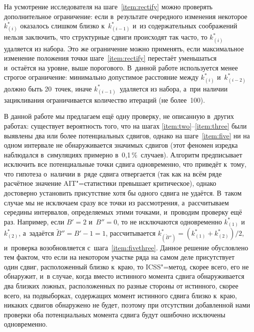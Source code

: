 \documentclass[11pt]{article}
\begin{document}
На усмотрение исследователя на шаге~\ref{item:rectify} можно проверять дополнительное ограничение: если в~результате очередного изменения некоторое $k^*_{(i)}$ оказалось слишком близко к~$k^*_{(i-1)}$ и~из содержательных соображений нельзя заключить, что структурные сдвиги происходят так часто, то $k^*_{(i)}$ удаляется из набора. Это же ограничение можно применять, если максимальное изменение положения точки шаге~\ref{item:rectify} перестаёт уменьшаться и~остаётся на уровне, выше порогового. В~данной работе используется менее строгое ограничение: минимально допустимое расстояние между $k^*_{(i)}$ и~$k^*_{(i-2)}$ должно быть 20~точек, иначе $k^*_{(i-1)}$~удаляется из набора, а~при наличии зацикливания ограничивается количество итераций (не более~100).

В данной работе мы предлагаем ещё одну проверку, не описанную в~других работах: существует вероятность того, что на шагах \ref{item:two}--\ref{item:three} были выявлены два или более потенциальных сдвигов, однако на шаге~\ref{item:five} ни на одном интервале не обнаруживается значимых сдвигов (этот феномен изредка наблюдался в~симуляциях примерно в~0{,}1\,\%~случаев). Алгоритм предписывает исключить все потенциальные точки сдвига одновременно, что приведёт к~тому, что гипотеза о~наличии в~ряде сдвига отвергается (так как на всём ряде расчётное значение AIT"=статистики превышает критическое), однако достоверно установить присутствие хотя бы одного сдвига не удаётся. В~таком случае мы не исключаем сразу все точки из рассмотрения, а~рассчитываем середины интервалов, определяемых этими точками, и~проводим проверку ещё раз. Например, если $B' = 2$ и~$B'' = 0$, то не исключаются одновременно $k^*_{(1)}$ и~$k^*_{(2)}$, а~задаётся $\tilde B'' = B' - 1 = 1$, рассчитывается $k^{*}_{(\tilde B'')} = (k^*_{(1)} + k^*_{(2)})/2$, и~проверка возобновляется с~шага~\ref{item:fivethree}. Данное решение обусловлено тем фактом, что если на некотором участке ряда на самом деле присутствует один сдвиг, расположенный близко к~краю, то ICSS"=метод, скорее всего, его не обнаружит, и~в случае, когда вместо истинного момента сдвига обнаруживается два близких ложных, расположенных по разные стороны от истинного, скорее всего, на подвыборках, содержащих момент истинного сдвига близко к~краю, никаких сдвигов обнаружено не будет, поэтому при отсутствии добавленной нами проверки оба потенциальных момента сдвига будут ошибочно исключены одновременно.

\printbibliography
\end{document}
